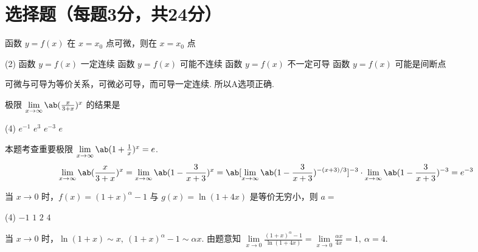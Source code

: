 \section{选择题（每题3分，共24分）}

\begin{problem}
  函数 $y = f(x)$ 在 $x = x_0$ 点可微，则在 $x = x_0$ 点
  \begin{tasks}(2)
    \task[\true] 函数 $y = f(x)$ 一定连续
    \task 函数 $y = f(x)$ 可能不连续
    \task 函数 $y = f(x)$ 不一定可导
    \task 函数 $y = f(x)$ 可能是间断点
  \end{tasks}
\end{problem}
\begin{solution}
  可微与可导为等价关系，可微必可导，而可导一定连续. 所以A选项正确.
\end{solution}

\begin{problem}
  极限 $\lim\limits_{x \to \infty} \ab(\frac{x}{3 +  x})^x$ 的结果是
  \begin{tasks}(4)
    \task $e^{-1}$
    \task $e^3$
    \task[\true] $e^{-3}$
    \task $e$
  \end{tasks}
\end{problem}
\begin{solution}
  本题考查重要极限 $\lim\limits_{x \to \infty} \ab(1 + \frac1x)^x = e$.
  \[
    \lim\limits_{x \to \infty} \ab(\frac{x}{3 + x})^x
  = \lim\limits_{x \to \infty} \ab(1 - \frac{3}{x + 3})^x
  = \ab[\lim\limits_{x \to \infty} \ab(1 - \frac{3}{x + 3})^{-(x + 3)/3}]^{-3}
    \cdot \lim\limits_{x \to \infty} \ab(1 - \frac{3}{x + 3})^{-3} = e^{-3}
  \]
\end{solution}

\begin{problem}
  当 $x \to 0$ 时，$f(x) = (1 + x)^\alpha - 1$ 与 $g(x) = \ln(1 + 4x)$
  是等价无穷小，则 $a = $
  \begin{tasks}(4)
    \task $-1$
    \task $1$
    \task $2$
    \task[\true] $4$
  \end{tasks}
\end{problem}
\begin{solution}
  当 $x \to 0$ 时，$\ln (1 + x) \sim x,~ (1 + x)^\alpha - 1 \sim \alpha x$.
  由题意知
  $ \lim\limits_{x \to 0} \frac{(1 + x)^\alpha - 1}{\ln(1 + 4x)}
  = \lim\limits_{x \to 0} \frac{\alpha x}{4x} = 1,~ \alpha = 4$.
\end{solution}

